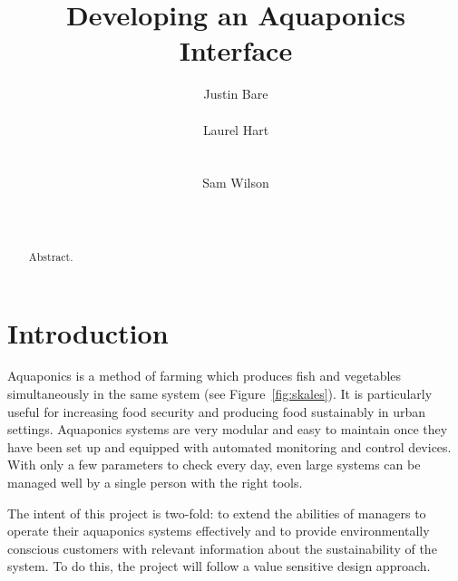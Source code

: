 \documentclass{sigchi}
\begin{document}
\title{Developing an Aquaponics Interface}

\author{
  \alignauthor Justin Bare\\
    \\
  \alignauthor Laurel Hart\\
    \\
    \\
  \alignauthor Sam Wilson\\
    \\
    \\
}

\maketitle

\begin{abstract}
Abstract.
\end{abstract}



\section{Introduction}

Aquaponics is a method of farming which produces fish and vegetables simultaneously in the same system (see Figure~\ref{fig:skales}). It is particularly useful for increasing food security and producing food sustainably in urban settings. Aquaponics systems are very modular and easy to maintain once they have been set up and equipped with automated monitoring and control devices. With only a few parameters to check every day, even large systems can be managed well by a single person with the right tools. 

The intent of this project is two-fold: to extend the abilities of managers to operate their aquaponics systems effectively and to provide environmentally conscious customers with relevant information about the sustainability of the system. To do this, the project will follow a value sensitive design approach.
\end{document}
